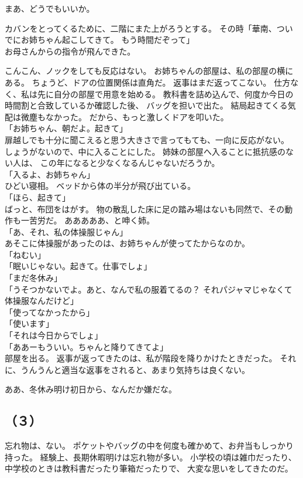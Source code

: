 \documentclass[../IHMain]{subfiles}
\begin{document}
まあ、どうでもいいか。

カバンをとってくるために、二階にまた上がろうとする。
その時「華南、ついでにお姉ちゃん起こしてきて。
もう時間だぞって」\\
お母さんからの指令が飛んできた。

こんこん、ノックをしても反応はない。
お姉ちゃんの部屋は、私の部屋の横にある。
ちょうど、ドアの位置関係は直角だ。
返事はまだ返ってこない。
仕方なく、私は先に自分の部屋で用意を始める。
教科書を詰め込んで、何度か今日の時間割と合致しているか確認した後、
バッグを担いで出た。
結局起きてくる気配は微塵もなかった。
だから、もっと激しくドアを叩いた。\\
「お姉ちゃん、朝だよ。起きて」\\
扉越しでも十分に聞こえると思う大きさで言ってもても、一向に反応がない。
しょうがないので、中に入ることにした。
姉妹の部屋へ入ることに抵抗感のない人は、
この年になると少なくなるんじゃないだろうか。\\
「入るよ、お姉ちゃん」\\
ひどい寝相。
ベッドから体の半分が飛び出ている。\\
「ほら、起きて」\\
ばっと、布団をはがす。
物の散乱した床に足の踏み場はないも同然で、その動作も一苦労だ。
あああああ、と呻く姉。\\
「あ、それ、私の体操服じゃん」\\
あそこに体操服があったのは、お姉ちゃんが使ってたからなのか。\\
「ねむい」\\
「眠いじゃない。起きて。仕事でしょ」\\
「まだ冬休み」\\
「うそつかないでよ。あと、なんで私の服着てるの？
それパジャマじゃなくて体操服なんだけど」\\
「使ってなかったから」\\
「使います」\\
「それは今日からでしょ」\\
「ああーもういい。ちゃんと降りてきてよ」\\
部屋を出る。
返事が返ってきたのは、私が階段を降りかけたときだった。
それに、うんうんと適当な返事をされると、あまり気持ちは良くない。

ああ、冬休み明け初日から、なんだか嫌だな。

\subsection*{\gt（３）}
忘れ物は、ない。
ポケットやバッグの中を何度も確かめて、お弁当もしっかり持った。
経験上、長期休暇明けは忘れ物が多い。
小学校の頃は雑巾だったり、中学校のときは教科書だったり筆箱だったりで、
大変な思いをしてきたのだ。
\end{document}
